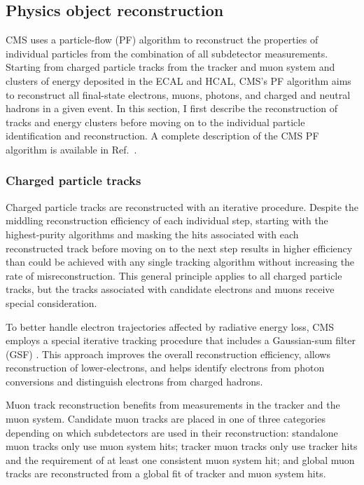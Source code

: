 \subsection{Physics object reconstruction}
\label{cms_reco}
CMS uses a particle-flow (PF) algorithm to reconstruct the properties of individual particles from the combination of all subdetector measurements. Starting from charged particle tracks from the tracker and muon system and clusters of energy deposited in the ECAL and HCAL, CMS's PF algorithm aims to reconstruct all final-state electrons, muons, photons, and charged and neutral hadrons in a given event. In this section, I first describe the reconstruction of tracks and energy clusters before moving on to the individual particle identification and reconstruction. A complete description of the CMS PF algorithm is available in Ref.~\cite{cms_pf}.

\subsubsection{Charged particle tracks}
Charged particle tracks are reconstructed with an iterative procedure. Despite the middling reconstruction efficiency of each individual step, starting with the highest-purity algorithms and masking the hits associated with each reconstructed track before moving on to the next step results in higher efficiency than could be achieved with any single tracking algorithm without increasing the rate of misreconstruction. This general principle applies to all charged particle tracks, but the tracks associated with candidate electrons and muons receive special consideration.

To better handle electron trajectories affected by radiative energy loss, CMS employs a special iterative tracking procedure that includes a Gaussian-sum filter (GSF) \cite{gsf}. This approach improves the overall reconstruction efficiency, allows reconstruction of lower-\pt electrons, and helps identify electrons from photon conversions and distinguish electrons from charged hadrons.

Muon track reconstruction benefits from measurements in the tracker and the muon system. Candidate muon tracks are placed in one of three categories depending on which subdetectors are used in their reconstruction: standalone muon tracks only use muon system hits; tracker muon tracks only use tracker hits and the requirement of at least one consistent muon system hit; and global muon tracks are reconstructed from a global fit of tracker and muon system hits.

